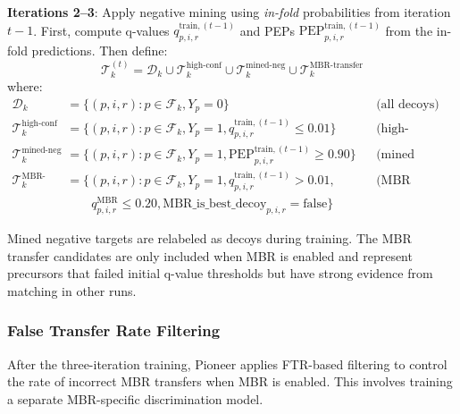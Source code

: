\documentclass[pdflatex,sn-nature]{sn-jnl}
\begin{document}
\textbf{Iterations 2--3}: Apply negative mining using \emph{in-fold} probabilities from iteration $t-1$. First, compute q-values $q_{p,i,r}^{\text{train},(t-1)}$ and PEPs $\text{PEP}_{p,i,r}^{\text{train},(t-1)}$ from the in-fold predictions. Then define:
\begin{equation}
  \mathcal{T}_{k}^{(t)} = \mathcal{D}_k \cup \mathcal{T}_k^{\text{high-conf}} \cup \mathcal{T}_k^{\text{mined-neg}} \cup \mathcal{T}_k^{\text{MBR-transfer}}
\end{equation}
where:
\begin{align}
  \mathcal{D}_k &= \{(p,i,r) : p \in \mathcal{F}_{k}, Y_p = 0\} && \text{(all decoys)} \\
  \mathcal{T}_k^{\text{high-conf}} &= \{(p,i,r) : p \in \mathcal{F}_{k}, Y_p = 1, q_{p,i,r}^{\text{train},(t-1)} \leq 0.01\} && \text{(high-confidence targets)} \\
  \mathcal{T}_k^{\text{mined-neg}} &= \{(p,i,r) : p \in \mathcal{F}_{k}, Y_p = 1, \text{PEP}_{p,i,r}^{\text{train},(t-1)} \geq 0.90\} && \text{(mined negatives)} \\
  \mathcal{T}_k^{\text{MBR-transfer}} &= \{(p,i,r) : p \in \mathcal{F}_{k}, Y_p = 1, q_{p,i,r}^{\text{train},(t-1)} > 0.01, && \text{(MBR candidates)} \\
  & \qquad q_{p,i,r}^{\text{MBR}} \leq 0.20, \text{MBR\_is\_best\_decoy}_{p,i,r} = \text{false}\} &&
\end{align}

Mined negative targets are relabeled as decoys during training. The MBR transfer candidates are only included when MBR is enabled and represent precursors that failed initial q-value thresholds but have strong evidence from matching in other runs.

\subsubsection{False Transfer Rate Filtering}\label{subsubsec:false-transfer-rate-filtering}

After the three-iteration training, Pioneer applies FTR-based filtering to control the rate of incorrect MBR transfers when MBR is enabled. This involves training a separate MBR-specific discrimination model.
\end{document}
